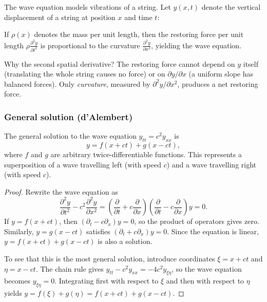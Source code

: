 \documentclass[a4paper]{article}
\begin{document}
\begin{remark}
  The wave equation models vibrations of a string. Let $y(x, t)$ denote the vertical displacement of a string at position $x$ and time $t$:
  \begin{center}
  \end{center}
  If $\rho(x)$ denotes the mass per unit length, then the restoring force per unit length $\rho \frac{\partial ^2 y}{\partial t^2}$ is proportional to the curvature $\frac{\partial^2 y}{\partial x^2}$, yielding the wave equation.
\end{remark}

\begin{remark}
  Why the second spatial derivative? The restoring force cannot depend on $y$ itself (translating the whole string causes no force) or on $\partial y/\partial x$ (a uniform slope has balanced forces). Only \emph{curvature}, measured by $\partial^2 y/\partial x^2$, produces a net restoring force.
\end{remark}

\subsubsection*{General solution (d'Alembert)}

\begin{prop}
  The general solution to the wave equation $y_{tt} = c^2 y_{xx}$ is
  \[
    y = f(x + ct) + g(x - ct),
  \]
  where $f$ and $g$ are arbitrary twice-differentiable functions. This represents a superposition of a wave travelling left (with speed $c$) and a wave travelling right (with speed $c$).
\end{prop}

\begin{proof}
  Rewrite the wave equation as
  \[
    \frac{\partial ^2 y}{\partial t^2} - c^2 \frac{\partial^2 y}{\partial x^2} = \left(\frac{\partial}{\partial t} + c\frac{\partial}{\partial x}\right)\left(\frac{\partial}{\partial t} - c\frac{\partial}{\partial x}\right) y = 0.
  \]
  If $y = f(x + ct)$, then $(\partial_t - c\partial_x)y = 0$, so the product of operators gives zero. Similarly, $y = g(x - ct)$ satisfies $(\partial_t + c\partial_x)y = 0$. Since the equation is linear, $y = f(x + ct) + g(x - ct)$ is also a solution.

  To see that this is the most general solution, introduce coordinates $\xi = x + ct$ and $\eta = x - ct$. The chain rule gives $y_{tt} - c^2 y_{xx} = -4c^2 y_{\xi\eta}$, so the wave equation becomes $y_{\xi\eta} = 0$. Integrating first with respect to $\xi$ and then with respect to $\eta$ yields $y = f(\xi) + g(\eta) = f(x + ct) + g(x - ct)$.
\end{proof}
\end{document}
